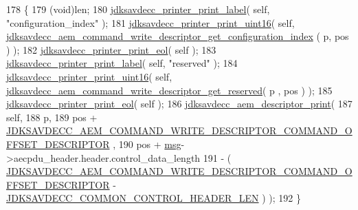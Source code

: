 \begin{DoxyCode}
178 \{
179     (void)len;
180     \hyperlink{group__util_gaf7818b24143b3c7502926a425a242ff5}{jdksavdecc\_printer\_print\_label}( \textcolor{keyword}{self}, \textcolor{stringliteral}{"configuration\_index"} );
181     \hyperlink{group__util_ga9793e0ff8e7ed25d957282ee6b257ce2}{jdksavdecc\_printer\_print\_uint16}( \textcolor{keyword}{self}, 
      \hyperlink{group__command__write__descriptor_gaacd8df9d64b3dd0b9a0453d67251fb2e}{jdksavdecc\_aem\_command\_write\_descriptor\_get\_configuration\_index}
      ( p, pos ) );
182     \hyperlink{group__util_gacda56c9d3d24593a52c999682fa6e6e3}{jdksavdecc\_printer\_print\_eol}( \textcolor{keyword}{self} );
183     \hyperlink{group__util_gaf7818b24143b3c7502926a425a242ff5}{jdksavdecc\_printer\_print\_label}( \textcolor{keyword}{self}, \textcolor{stringliteral}{"reserved"} );
184     \hyperlink{group__util_ga9793e0ff8e7ed25d957282ee6b257ce2}{jdksavdecc\_printer\_print\_uint16}( \textcolor{keyword}{self}, 
      \hyperlink{group__command__write__descriptor_ga6c3320a31f0e9a287eb341efdb0d0ccb}{jdksavdecc\_aem\_command\_write\_descriptor\_get\_reserved}( p
      , pos ) );
185     \hyperlink{group__util_gacda56c9d3d24593a52c999682fa6e6e3}{jdksavdecc\_printer\_print\_eol}( \textcolor{keyword}{self} );
186     \hyperlink{group__aem__print_gadd626df0712b38901c31f452c182ee82}{jdksavdecc\_aem\_descriptor\_print}(
187         \textcolor{keyword}{self},
188         p,
189         pos + \hyperlink{group__command__write__descriptor_ga9696afdfbb33dd5892ab5377e8e4db74}{JDKSAVDECC\_AEM\_COMMAND\_WRITE\_DESCRIPTOR\_COMMAND\_OFFSET\_DESCRIPTOR}
      ,
190         pos + \hyperlink{maap__log__linux_8c_a0c7e58a50354c4a4d6dad428d0e47029}{msg}->aecpdu\_header.header.control\_data\_length
191         - ( \hyperlink{group__command__write__descriptor_ga9696afdfbb33dd5892ab5377e8e4db74}{JDKSAVDECC\_AEM\_COMMAND\_WRITE\_DESCRIPTOR\_COMMAND\_OFFSET\_DESCRIPTOR}
       - \hyperlink{group__jdksavdecc__avtp__common__control__header_gaae84052886fb1bb42f3bc5f85b741dff}{JDKSAVDECC\_COMMON\_CONTROL\_HEADER\_LEN} ) );
192 \}
\end{DoxyCode}


